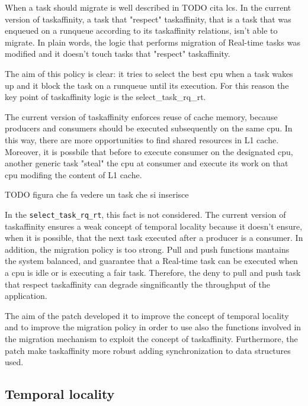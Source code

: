 When a task should migrate is well described in TODO cita lcs. In the current version of taskaffinity, a task that "respect" taskaffinity, that is a task 
that was enqueued on a runqueue according to its taskaffinity relations, isn't able to migrate. In plain words, the logic that performs migration of 
Real-time tasks was modified and it doesn't touch tasks that "respect" taskaffinity.

The aim of this policy is clear: it tries to select the best cpu when a task wakes up and it block the task on a runqueue until its execution. For this
reason the key point of taskaffinity logic is the select\_task\_rq\_rt.

The current version of taskaffinity enforces reuse of cache memory, because producers and consumers should be executed subsequently on the same cpu. In this
way, there are more opportunities to find shared resources in L1 cache. Moreover, it is possbile that before to execute consumer on the designated cpu, 
another generic task "steal" the cpu at consumer and execute its work on that cpu modifing the content of L1 cache.

TODO figura che fa vedere un task che si inserisce

In the \texttt{select\_task\_rq\_rt}, this fact is not considered. The current version of taskaffinity ensures a weak concept of temporal locality because 
it doesn't ensure, when it is possible, that the next task executed after a producer is a consumer. In addition, the migration policy is too strong. Pull
and push functions mantains the system balanced, and guarantee that a Real-time task can be executed when a cpu is idle or is executing a fair task.
Therefore, the deny to pull and push task that respect taskaffinity can degrade singnificantly the throughput of the application.

The aim of the patch developed it to improve the concept of temporal locality and to improve the migration policy in order to use also the functions 
involved in the migration mechanism to exploit the concept of taskaffinity. Furthermore, the patch make taskaffinity more robust adding synchronization 
to data structures used.

\subsection{Temporal locality}

